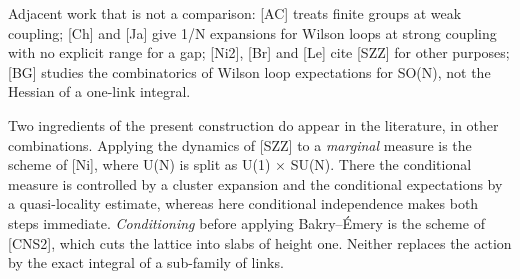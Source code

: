 \documentclass[11pt,a4paper]{article}
\theoremstyle{named}
\begin{document}
Adjacent work that is not a comparison: [AC] treats finite groups at weak coupling; [Ch] and [Ja] give 1/N expansions for Wilson loops at strong coupling with no explicit range for a gap; [Ni2], [Br] and [Le] cite [SZZ] for other purposes; [BG] studies the combinatorics of Wilson loop expectations for SO(N), not the Hessian of a one-link integral.

Two ingredients of the present construction do appear in the literature, in other combinations. Applying the dynamics of [SZZ] to a \textit{marginal} measure is the scheme of [Ni], where U(N) is split as U(1) × SU(N). There the conditional measure is controlled by a cluster expansion and the conditional expectations by a quasi-locality estimate, whereas here conditional independence makes both steps immediate. \textit{Conditioning} before applying Bakry–Émery is the scheme of [CNS2], which cuts the lattice into slabs of height one. Neither replaces the action by the exact integral of a sub-family of links.
\end{document}
